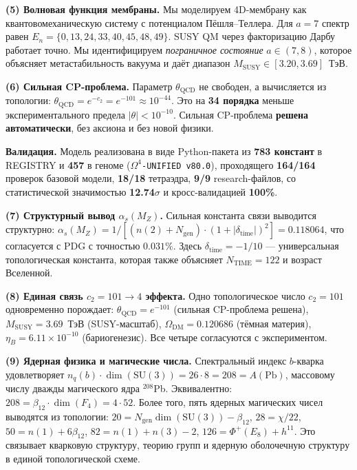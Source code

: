 \documentclass[11pt,a4paper]{article}
\newcommand{\SU}{\ensuremath{\mathrm{SU}}}
\newcommand{\Ngen}{\ensuremath{N_{\text{gen}}}}
\theoremstyle{definition}
\begin{document}
\medskip\noindent
\textbf{(5) Волновая функция мембраны.}
Мы моделируем 4D-мембрану как квантовомеханическую систему
с потенциалом Пёшля--Теллера. Для $a = 7$ спектр равен
$E_n = \{0, 13, 24, 33, 40, 45, 48, 49\}$. SUSY QM через
факторизацию Дарбу работает точно. Мы идентифицируем
\emph{пограничное состояние} $a \in (7, 8)$, которое
объясняет метастабильность вакуума и даёт диапазон
$M_{\text{SUSY}} \in [3.20, 3.69]$~ТэВ.

\medskip\noindent
\textbf{(6) Сильная CP-проблема.}
Параметр $\theta_{\text{QCD}}$ не свободен, а вычисляется из
топологии: $\theta_{\text{QCD}} = e^{-c_2} = e^{-101} \approx 10^{-44}$.
Это на \textbf{34 порядка} меньше экспериментального предела
$|\theta| < 10^{-10}$. Сильная CP-проблема \textbf{решена автоматически},
без аксиона и без новой физики.

\medskip\noindent
\textbf{Валидация.}
Модель реализована в виде Python-пакета из \textbf{783 констант}
в REGISTRY и \textbf{457} в геноме
(\texttt{$\Omega^4$-UNIFIED v80.0}), проходящего \textbf{164/164}
проверок базовой модели, \textbf{18/18} тетраэдра, \textbf{9/9}
research-файлов, со статистической значимостью \textbf{12.74$\sigma$}
и кросс-валидацией \textbf{100\%}.

\medskip\noindent
\textbf{(7) Структурный вывод $\alpha_s(M_Z)$.}
Сильная константа связи выводится структурно:
$\alpha_s(M_Z) = 1/[(n(2)+N_{\text{gen}})
\cdot (1+|\delta_{\text{time}}|)^2] = 0.118064$,
что согласуется с PDG с точностью $0.031\%$.
Здесь $\delta_{\text{time}} = -1/10$ — универсальная
топологическая константа, которая также объясняет
$N_{\text{TIME}} = 122$ и возраст Вселенной.

\medskip\noindent
\textbf{(8) Единая связь $c_2 = 101 \to 4$ эффекта.}
Одно топологическое число $c_2 = 101$ одновременно порождает:
$\theta_{\text{QCD}} = e^{-101}$ (сильная CP-проблема решена),
$M_{\text{SUSY}} = 3.69$~ТэВ (SUSY-масштаб),
$\Omega_{\text{DM}} = 0.120686$ (тёмная материя),
$\eta_B = 6.11 \times 10^{-10}$ (бариогенезис).
Все четыре согласуются с экспериментом.

\medskip\noindent
\textbf{(9) Ядерная физика и магические числа.}
Спектральный индекс $b$-кварка удовлетворяет
$n_q(b) \cdot \dim(\SU(3)) = 26 \cdot 8 = 208 = A(\text{Pb})$,
массовому числу дважды магического ядра $^{208}$Pb.
Эквивалентно: $208 = \beta_{12} \cdot \dim(F_4) = 4 \cdot 52$.
Более того, пять ядерных магических чисел выводятся из топологии:
$20 = \Ngen \dim(\SU(3)) - \beta_{12}$,
$28 = \chi/22$,
$50 = n(1) + 6\beta_{12}$,
$82 = n(1) + n(3) - 2$,
$126 = \Phi^+(E_8) + h^{11}$.
Это связывает кварковую структуру, теорию групп и ядерную оболочечную
структуру в единой топологической схеме.
\end{document}
